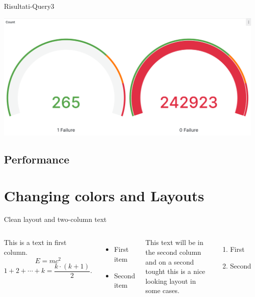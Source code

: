 \documentclass[13pt,aspectratio=169,t,xcolor=table]{beamer}
\begin{document}
\begin{frame}{Risultati-Query3}
    \begin{minipage}{0.9\textwidth}
        \begin{adjustbox}{margin=1cm 0cm 1.5cm 0cm, center}
            \includegraphics[width=1\textwidth]{res/query3_panel2.png}
        \end{adjustbox}
    \end{minipage}
\end{frame}

\subsection{Performance}

\section{Changing colors and Layouts}


\begin{frame}{Clean layout and two-column text}
    
    \begin{columns}
    
        This is a text in first column.
        $$E=mc^2$$
        $$ 1 + 2 + \cdots + k =  \frac{k \cdot (k + 1)}{2}.$$
        \begin{itemize}
        \item First item
       
        \item Second item
        \end{itemize}
        
        This text will be in the second column
        and on a second tought this is a nice looking
        layout in some cases.
        
        \begin{enumerate}
            \item First
            \item Second
        \end{enumerate}
        
    \end{columns}
    
\end{frame}
\end{document}
